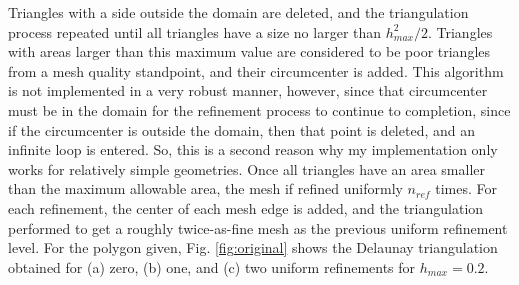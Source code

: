 \documentclass[10pt]{article}
\begin{document}
Triangles with a side outside the domain are deleted, and the triangulation process repeated until all triangles have a size no larger than \(h_{max}^2/2\). Triangles with areas larger than this maximum value are considered to be poor triangles from a mesh quality standpoint, and their circumcenter is added. This algorithm is not implemented in a very robust manner, however, since that circumcenter must be in the domain for the refinement process to continue to completion, since if the circumcenter is outside the domain, then that point is deleted, and an infinite loop is entered. So, this is a second reason why my implementation only works for relatively simple geometries. Once all triangles have an area smaller than the maximum allowable area, the mesh if refined uniformly \(n_{ref}\) times. For each refinement, the center of each mesh edge is added, and the triangulation performed to get a roughly twice-as-fine mesh as the previous uniform refinement level. For the polygon given, Fig. \ref{fig:original} shows the Delaunay triangulation obtained for (a) zero, (b) one, and (c) two uniform refinements for \(h_{max}=0.2\).
\end{document}
